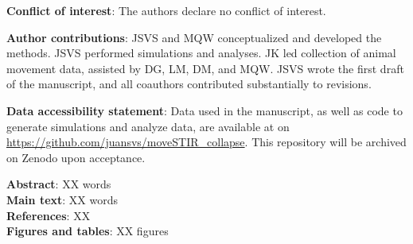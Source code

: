 \documentclass[letterpaper]{article}
\begin{document}
\noindent
\textbf{Conflict of interest}: The authors declare no conflict of interest.

\bigskip
\noindent
\textbf{Author contributions}: JSVS and MQW conceptualized and developed the methods. JSVS performed simulations and analyses. JK led collection of animal movement data, assisted by DG, LM, DM, and MQW. JSVS wrote the first draft of the manuscript, and all coauthors contributed substantially to revisions. 

\bigskip
\noindent
\textbf{Data accessibility statement}: Data used in the manuscript, as well as code to generate simulations and analyze data, are available at on \url{https://github.com/juansvs/moveSTIR_collapse}. This repository will be archived on Zenodo upon acceptance.

\bigskip
\noindent
\textbf{Abstract}: XX words\\
\textbf{Main text}:  XX words\\
\textbf{References}: XX \\
\textbf{Figures and tables}: XX figures \\

\newpage

\doublespacing
\linenumbers
\end{document}
